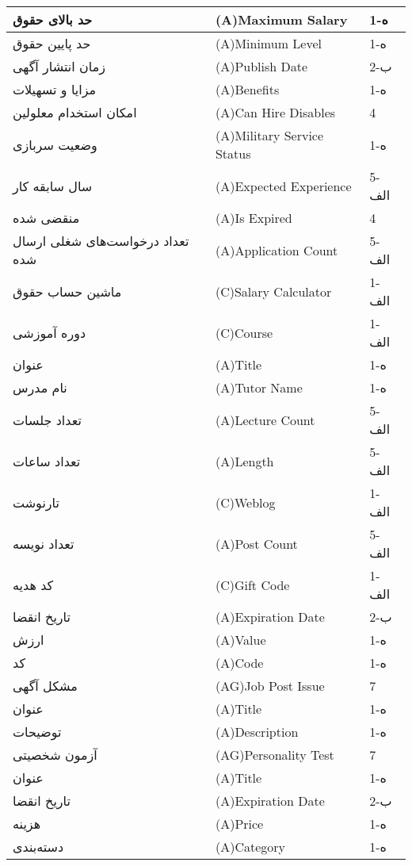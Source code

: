 \documentclass[12pt]{article}
\begin{document}
\begin{longtable}{|l|l|l|}
		\hline
		حد بالای حقوق & (A)Maximum Salary & 1-ه   \\
		\hline
		حد پایین حقوق & (A)Minimum Level & 1-ه   \\
		\hline
		زمان انتشار آگهی & (A)Publish Date & 2-ب   \\
		\hline
		مزایا و تسهیلات & (A)Benefits & 1-ه   \\
		\hline
		امکان استخدام معلولین & (A)Can Hire Disables & 4     \\
		\hline
		وضعیت سربازی & (A)Military Service Status & 1-ه   \\
		\hline
		سال سابقه کار & (A)Expected Experience & 5-الف \\
		\hline
		منقضی شده & (A)Is Expired & 4     \\
		\hline
		تعداد درخواست‌های شغلی ارسال شده & (A)Application Count & 5-الف \\
		\hline
		ماشین حساب حقوق & (C)Salary Calculator & 1-الف \\
		\hline
		دوره آموزشی & (C)Course & 1-الف \\
		\hline
		عنوان & (A)Title & 1-ه   \\
		\hline
		نام مدرس & (A)Tutor Name & 1-ه   \\
		\hline
		تعداد جلسات & (A)Lecture Count & 5-الف \\
		\hline
		تعداد ساعات & (A)Length & 5-الف \\
		\hline
		تارنوشت & (C)Weblog & 1-الف \\
		\hline
		تعداد نویسه & (A)Post Count & 5-الف \\
		\hline
		کد هدیه & (C)Gift Code & 1-الف \\
		\hline
		تاریخ انقضا & (A)Expiration Date & 2-ب   \\
		\hline
		ارزش & (A)Value & 1-ه   \\
		\hline
		کد & (A)Code & 1-ه   \\
		\hline
		مشکل آگهی & (AG)Job Post Issue & 7     \\
		\hline
		عنوان & (A)Title & 1-ه   \\
		\hline
		توضیحات & (A)Description & 1-ه   \\
		\hline
		آزمون شخصیتی & (AG)Personality Test & 7     \\
		\hline
		عنوان & (A)Title & 1-ه   \\
		\hline
		تاریخ انقضا & (A)Expiration Date & 2-ب   \\
		\hline
		هزینه & (A)Price & 1-ه   \\
		\hline
		دسته‌بندی & (A)Category & 1-ه   \\

\end{longtable}
\end{document}
